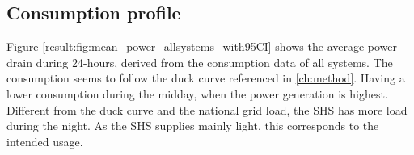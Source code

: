 \subsection{Consumption profile}
Figure \ref{result:fig:mean_power_allsystems_with95CI} shows the average power drain during 24-hours, derived from the consumption data of all systems. The consumption seems to follow the duck curve referenced in \ref{ch:method}. Having a lower consumption during the midday, when the power generation is highest. Different from the duck curve and the national grid load, the SHS has more load during the night. As the SHS supplies mainly light, this corresponds to the intended usage. 

\begin{figure}[H] %
    \centering %


\end{figure}

